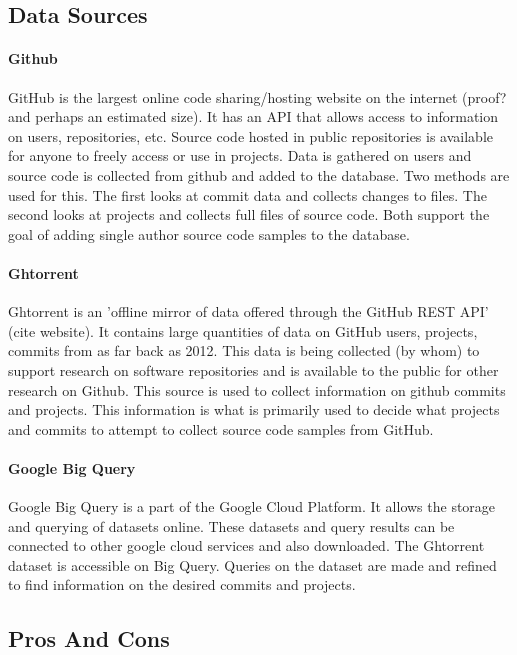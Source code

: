 \documentclass{article}
\begin{document}
\subsection{Data Sources}
\paragraph{Github}
GitHub is the largest online code sharing/hosting website on the internet (proof? and perhaps an estimated size). It has an API that allows access to information on users, repositories, etc. Source code hosted in public repositories is available for anyone to freely access or use in projects. Data is gathered on users and source code is collected from github and added to the database. Two methods are used for this. The first looks at commit data and collects changes to files. The second looks at projects and collects full files of source code. Both support the goal of adding single author source code samples to the database.

\paragraph{Ghtorrent}
Ghtorrent is an 'offline mirror of data offered through the GitHub REST API' (cite website). It contains large quantities of data on GitHub users, projects, commits from as far back as 2012. This data is being collected (by whom) to support research on software repositories and is available to the public for other research on Github. This source is used to collect information on github commits and projects. This information is what is primarily used to decide what projects and commits to attempt to collect source code samples from GitHub.

\paragraph{Google Big Query}
Google Big Query is a part of the Google Cloud Platform. It allows the storage and querying of datasets online. These datasets and query results can be connected to other google cloud services and also downloaded. The Ghtorrent dataset is accessible on Big Query. Queries on the dataset are made and refined to find information on the desired commits and projects.


\subsection{Pros And Cons}
\end{document}
